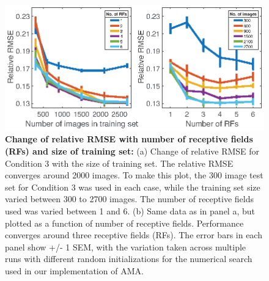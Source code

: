 \documentclass{jov}
\begin{document}
\begin{figure}
\centering
\includegraphics[width=\textwidth]{Figure13.eps}
\caption{{\bf Change of relative RMSE with number of receptive fields (RFs) and size of training set:} (a) Change of relative RMSE for Condition 3 with the size of training set. The relative RMSE converges around 2000 images. To make this plot, the 300 image test set for Condition 3 was used in each case, while the training set size varied between 300 to 2700 images. The number of receptive fields used was varied between 1 and 6. (b) Same data as in panel a, but plotted as a function of number of receptive fields. Performance converges around three receptive fields (RFs). The error bars in each panel show +/- 1 SEM, with the variation taken across multiple runs with different random initializations for the numerical search used in our implementation of AMA.}
 \label{fig:RMSEvsRF}
\end{figure}
\end{document}
